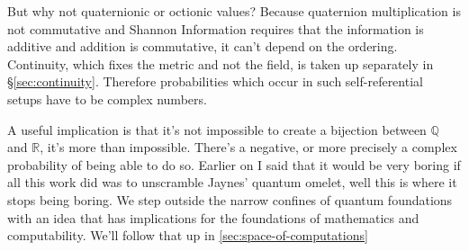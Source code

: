 
But why not quaternionic or octionic values? Because quaternion multiplication is not
commutative and Shannon Information requires that the information is additive and addition is
commutative, it can't depend on the ordering. Continuity, which fixes the metric and not the
field, is taken up separately in \S\ref{sec:continuity}. Therefore probabilities which occur in
such self-referential setups have to be complex numbers.

A useful implication is that it's not impossible to create a bijection between $\mathbb{Q}$ and
$\mathbb{R}$, it's more than impossible. There's a negative, or more precisely a complex
probability of being able to do so. Earlier on I said that it would be very boring if all this
work did was to unscramble Jaynes' quantum omelet, well this is where it stops being boring. We
step outside the narrow confines of quantum foundations with an idea that has implications for
the foundations of mathematics and computability. We'll follow that up in
\ref{sec:space-of-computations}

